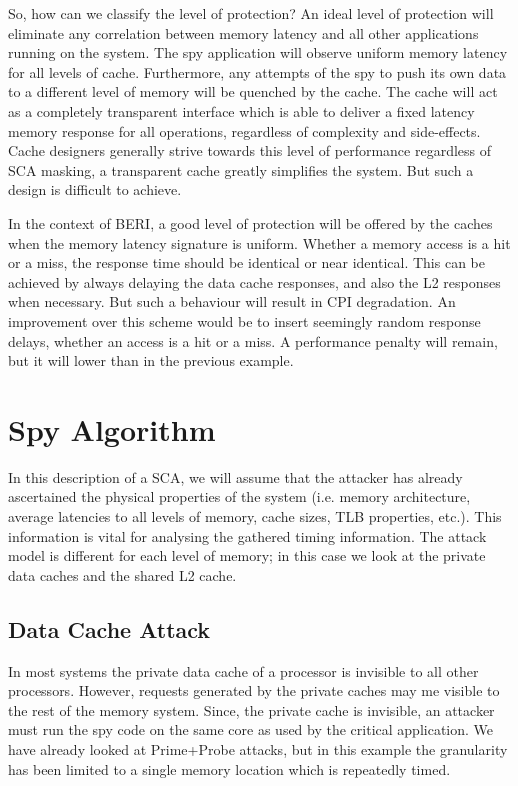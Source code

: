 	So, how can we classify the level of protection? An ideal level of protection will eliminate any correlation between memory latency and all other applications running on the system. The spy application will observe uniform memory latency for all levels of cache. Furthermore, any attempts of the spy to push its own data to a different level of memory will be quenched by the cache. The cache will act as a completely transparent interface which is able to deliver a fixed latency memory response for all operations, regardless of complexity and side-effects. Cache designers generally strive towards this level of performance regardless of SCA masking, a transparent cache greatly simplifies the system. But such a design is difficult to achieve.
	
	In the context of BERI, a good level of protection will be offered by the caches when the memory latency signature is uniform. Whether a memory access is a hit or a miss, the response time should be identical or near identical. This can be achieved by always delaying the data cache responses, and also the L2 responses when necessary. But such a behaviour will result in CPI degradation. An improvement over this scheme would be to insert seemingly random response delays, whether an access is a hit or a miss. A performance penalty will remain, but it will lower than in the previous example.
	
\section{Spy Algorithm}
	In this description of a SCA, we will assume that the attacker has already ascertained the physical properties of the system (i.e. memory architecture, average latencies to all levels of memory, cache sizes, TLB properties, etc.). This information is vital for analysing the gathered timing information. The attack model is different for each level of memory; in this case we look at the private data caches and the shared L2 cache.
	
	\subsection{Data Cache Attack}
		In most systems the private data cache of a processor is invisible to all other processors. However, requests generated by the private caches may me visible to the rest of the memory system. Since, the private cache is invisible, an attacker must run the spy code on the same core as used by the critical application. We have already looked at Prime+Probe attacks, but in this example the granularity has been limited to a single memory location which is repeatedly timed.
		
